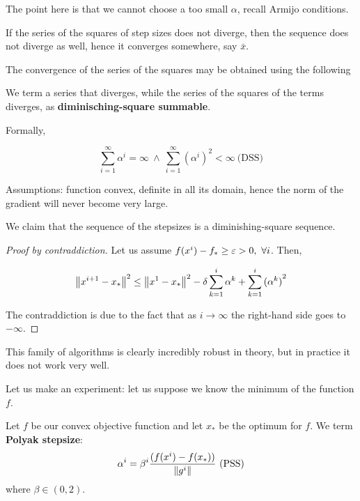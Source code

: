 \documentclass[ComputationalMathematics.tex]{subfiles}
\begin{document}
The point here is that we cannot choose a too small $\alpha$, recall Armijo conditions.

If the series of the squares of step sizes does not diverge, then the sequence does not diverge as well, hence it converges somewhere, say $\bar{x}$.

The convergence of the series of the squares may be obtained using the following 

\begin{definition}
  We term a series that diverges, while the series of the squares of the terms diverges, as \textbf{diminisching-square summable}.
  
  Formally,

	\[
    \sum\limits_{i=1}^\infty \alpha^i = \infty~\wedge~\sum\limits_{i=1}^\infty {(\alpha^i)}^2 < \infty~\text{(DSS)}
  	\]  
 
\end{definition}

Assumptions: function convex, definite in all its domain, hence the norm of the gradient will never become very large.

\begin{proposition}
We claim that the sequence of the stepsizes is a diminishing-square sequence.
\end{proposition}

\begin{proof}[Proof by contraddiction]
Let us assume $f(x^i) - f_* \ge \varepsilon > 0,~\forall i$. Then,

  \[
    {\left\lVert x^{i+1} - x_*\right\rVert}^2 \le {\left\lVert x^1 -x_*\right\rVert}^2 - \delta \sum\limits_{k=1}^{i} \alpha^k + \sum\limits_{k=1}^{i} {(\alpha^k)}^2
  \]

The contraddiction is due to the fact that as $i \to \infty$ the right-hand side goes to $- \infty$.
\end{proof}

This family of algorithms is clearly incredibly robust in theory, but in practice it does not work very well.

Let us make an experiment: let us suppose we know the minimum of the function $f$. 

\begin{definition}
Let $f$ be our convex objective function and let $x_*$ be the optimum for $f$.
  We term \textbf{Polyak stepsize}:
  \[
   \alpha^i = \beta^i \frac{(f(x^i) - f(x_*))}{\left\lVert g^i\right\rVert}~ \text{(PSS)}
  \]
  where $\beta \in (0, 2)$.

 \end{definition}
 
\end{document}
